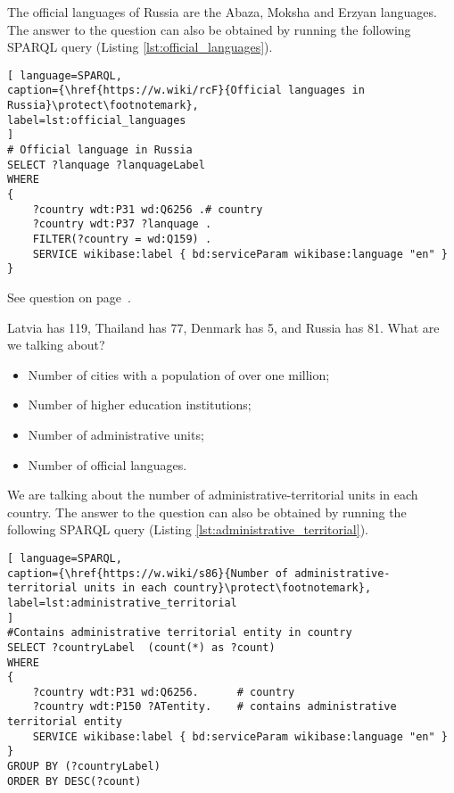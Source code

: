 The official languages of Russia are the Abaza, Moksha and Erzyan languages. The answer to the question can also be obtained by running the following SPARQL query (Listing \ref{lst:official_languages}).

\begin{lstlisting}[ language=SPARQL, 
caption={\href{https://w.wiki/rcF}{Official languages in Russia}\protect\footnotemark},
label=lst:official_languages
]
# Official language in Russia
SELECT ?lanquage ?lanquageLabel
WHERE
{
	?country wdt:P31 wd:Q6256 .# country
	?country wdt:P37 ?lanquage .
	FILTER(?country = wd:Q159) . 
	SERVICE wikibase:label { bd:serviceParam wikibase:language "en" }
}
\end{lstlisting}

See question on page~\pageref{question:official_language}.
\begin{exercise}
\label{answer:administrative_territorial}

Latvia has 119, Thailand has 77, Denmark has 5, and Russia has 81. What are we talking about?
\begin{itemize}
\item Number of cities with a population of over one million;
\item Number of higher education institutions;
\item Number of administrative units;
\item Number of official languages.
\end{itemize}

\end{exercise}

We are talking about the number of administrative-territorial units in each country. The answer to the question can also be obtained by running the following SPARQL query (Listing \ref{lst:administrative_territorial}).

\begin{lstlisting}[ language=SPARQL, 
caption={\href{https://w.wiki/s86}{Number of administrative-territorial units in each country}\protect\footnotemark},
label=lst:administrative_territorial
]
#Contains administrative territorial entity in country
SELECT ?countryLabel  (count(*) as ?count)
WHERE
{
	?country wdt:P31 wd:Q6256.      # country
	?country wdt:P150 ?ATentity.    # contains administrative territorial entity 
	SERVICE wikibase:label { bd:serviceParam wikibase:language "en" }
}
GROUP BY (?countryLabel)
ORDER BY DESC(?count)
\end{lstlisting}

